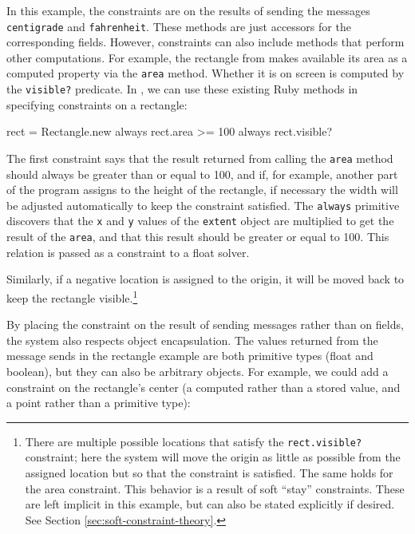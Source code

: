 In this example, the constraints are on the results of sending the
messages \lstinline{centigrade} and \lstinline{fahrenheit}. These
methods are just accessors for the corresponding fields.  However,
constraints can also include methods that perform other
computations. For example, the rectangle from
 makes available its area as a computed property
via the \lstinline{area} method.  Whether it is on screen is
computed by the \lstinline{visible?} predicate. In \toolname, we can
use these existing Ruby methods in specifying constraints on a rectangle:

\begin{code}
rect = Rectangle.new
always { rect.area >= 100 }
always { rect.visible? }
\end{code}

The first constraint says that the result returned from calling the
\lstinline{area} method should always be greater than or equal to 100,
and if, for example, another part of the program assigns to the height
of the rectangle, if necessary the width will be adjusted
automatically to keep the constraint satisfied. The \lstinline{always}
primitive discovers that the \lstinline{x} and \lstinline{y} values of
the \lstinline{extent} object are multiplied to get the result of the
\lstinline{area}, and that this result should be greater or equal to
100. This relation is passed as a constraint to a float solver.

Similarly, if a negative location is assigned to the origin, it will
be moved back to keep the rectangle visible.\footnote{There are
  multiple possible locations that satisfy the
  \lstinline{rect.visible?} constraint; here the system will move the
  origin as little as possible from the assigned location but so that
  the constraint is satisfied.  The same holds for the area
  constraint.  This behavior is a result of soft ``stay''
  constraints. These are left implicit in this example, but can also
  be stated explicitly if desired.  See Section
  \ref{sec:soft-constraint-theory}.}

By placing the constraint on the result of sending messages rather
than on fields, the system also respects object encapsulation.  The
values returned from the message sends in the rectangle example are
both primitive types (float and boolean), but they can also be
arbitrary objects.  For example, we could add a constraint on the
rectangle's center (a computed rather than a stored value, and a point
rather than a primitive type):

